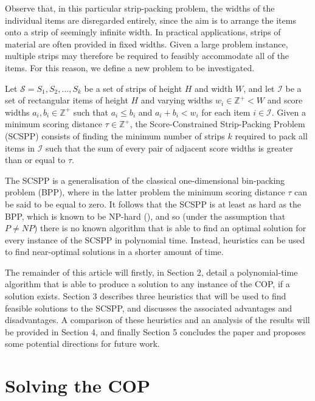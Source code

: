 \documentclass[oribibl]{llncs}
\begin{document}
Observe that, in this particular strip-packing problem, the widths of the individual items are disregarded entirely, since the aim is to arrange the items onto a strip of seemingly infinite width. In practical applications, strips of material are often provided in fixed widths. Given a large problem instance, multiple strips may therefore be required to feasibly accommodate all of the items. For this reason, we define a new problem to be investigated.

\begin{definition}
	\label{defn:scspp}
	Let $\mathcal{S} = S_1, S_2, ..., S_k$ be a set of strips of height $H$ and width $W$, and let $\mathcal{I}$ be a set of rectangular items of height $H$ and varying widths $w_i \in \mathbb{Z}^+ < W$ and score widths $a_i, b_i \in \mathbb{Z}^+$ such that $a_i \leq b_i$ and $a_i + b_i < w_i$ for each item $i \in \mathcal{I}$. Given a minimum scoring distance $\tau \in \mathbb{Z}^+$, the Score-Constrained Strip-Packing Problem (SCSPP) consists of finding the minimum number of strips $k$ required to pack all items in $\mathcal{I}$ such that the sum of every pair of adjacent score widths is greater than or equal to $\tau$.
\end{definition}

The SCSPP is a generalisation of the classical one-dimensional bin-packing problem (BPP), where in the latter problem the minimum scoring distance $\tau$ can be said to be equal to zero. It follows that the SCSPP is at least as hard as the BPP, which is known to be NP-hard (\citealp{garey1979}), and so (under the assumption that $P \neq NP$) there is no known algorithm that is able to find an optimal solution for every instance of the SCSPP in polynomial time. Instead, heuristics can be used to find near-optimal solutions in a shorter amount of time.

The remainder of this article will firstly, in Section 2, detail a polynomial-time algorithm that is able to produce a solution to any instance of the COP, if a solution exists. Section 3 describes three heuristics that will be used to find feasible solutions to the SCSPP, and discusses the associated advantages and disadvantages. A comparison of these heuristics and an analysis of the results will be provided in Section 4, and finally Section 5 concludes the paper and proposes some potential directions for future work.


\section{Solving the COP}
\label{sec:ahca}
\end{document}
